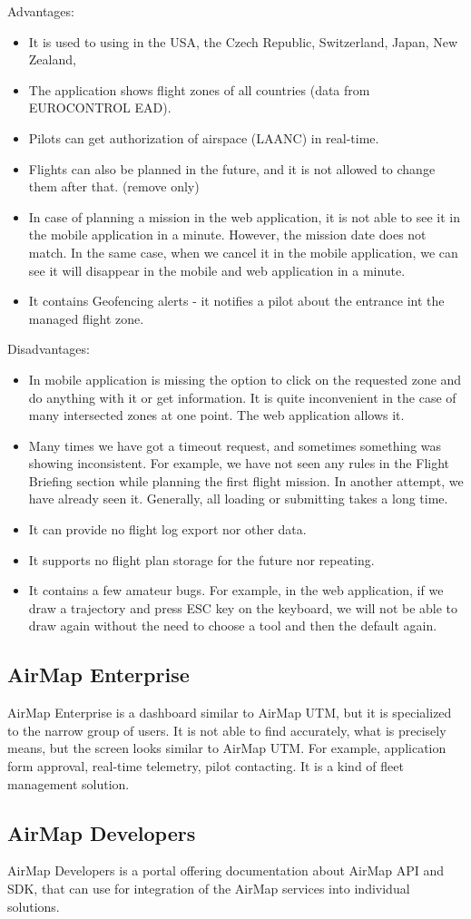 Advantages:
\begin{itemize}
    \item It is used to using in the USA, the Czech Republic, Switzerland, Japan, New Zealand, \textellipsis
    \item The application shows flight zones of all countries (data from EUROCONTROL EAD).\cite{eurocontrol}
    \item Pilots can get authorization of airspace (LAANC) in real-time.
    \item Flights can also be planned in the future, and it is not allowed to change them after that. (remove only)
    \item In case of planning a mission in the web application, it is not able to see it in the mobile application in a minute.
    However, the mission date does not match.
    In the same case, when we cancel it in the mobile application, we can see it will disappear in the mobile and web application in a minute.
    \item It contains Geofencing alerts - it notifies a pilot about the entrance int the managed flight zone.
\end{itemize}
Disadvantages:
\begin{itemize}
    \item In mobile application is missing the option to click on the requested zone and do anything with it or get information.
    It is quite inconvenient in the case of many intersected zones at one point.
    The web application allows it.
    \item Many times we have got a timeout request, and sometimes something was showing inconsistent.
    For example, we have not seen any rules in the Flight Briefing section while planning the first flight mission.
    In another attempt, we have already seen it.
    Generally, all loading or submitting takes a long time.
    \item It can provide no flight log export nor other data.
    \item It supports no flight plan storage for the future nor repeating.
    \item It contains a few amateur bugs.
    For example, in the web application, if we draw a trajectory and press ESC key on the keyboard, we will not be able to draw again without the need to choose a tool and then the default again.
\end{itemize}


\subsection{AirMap Enterprise}\label{subsec:airmap-enterprise}
AirMap Enterprise is a dashboard similar to AirMap UTM, but it is specialized to the narrow group of users.
It is not able to find accurately, what is precisely means, but the screen looks similar to AirMap UTM.
For example, application form approval, real-time telemetry, pilot contacting.
It is a kind of fleet management solution.


\subsection{AirMap Developers}\label{subsec:airmap-developers}
AirMap Developers is a portal offering documentation about AirMap API and SDK, that can use for integration of the AirMap services into individual solutions.\cite{airMapDevelopers}

